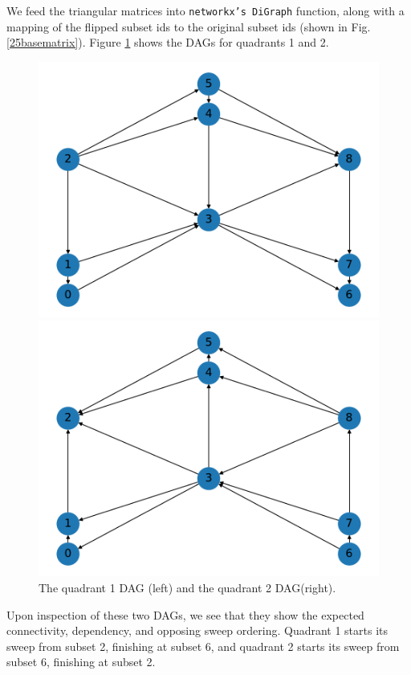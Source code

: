 We feed the triangular matrices into {\tt networkx's DiGraph} function, along with a mapping of the flipped subset ids to the original subset ids (shown in Fig. \ref{25basematrix}). Figure \ref{25_q1q2graphs} shows the DAGs for quadrants 1 and 2.
\begin{figure}[H]
\begin{minipage}[c]{0.5\textwidth}
\includegraphics[scale=0.5]{../../figures/9_graph1.pdf}
\end{minipage}
\begin{minipage}[c]{0.5\textwidth}
\includegraphics[scale=0.5]{../../figures/9_graph2.pdf}
\end{minipage}
\caption{The quadrant 1 DAG (left) and the quadrant 2 DAG(right).}
\label{25_q1q2graphs}
\end{figure}
Upon inspection of these two DAGs, we see that they show the expected connectivity, dependency, and opposing sweep ordering.
Quadrant 1 starts its sweep from subset 2, finishing at subset 6, and quadrant 2 starts its sweep from subset 6, finishing at subset 2.

